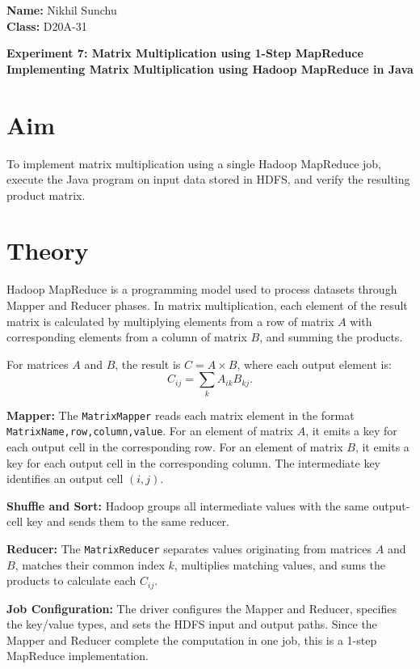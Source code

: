 \documentclass[11pt,a4paper]{article}
\begin{document}
\noindent
\textbf{Name:} Nikhil Sunchu\\
\textbf{Class:} D20A-31

\vspace{0.5em}
\begin{center}
{\Large\bfseries Experiment 7: Matrix Multiplication using 1-Step MapReduce}\\
\textbf{Implementing Matrix Multiplication using Hadoop MapReduce in Java}
\end{center}

\section*{Aim}
To implement matrix multiplication using a single Hadoop MapReduce job, execute the Java program on input data stored in HDFS, and verify the resulting product matrix.

\section{Theory}
Hadoop MapReduce is a programming model used to process datasets through Mapper and Reducer phases. In matrix multiplication, each element of the result matrix is calculated by multiplying elements from a row of matrix $A$ with corresponding elements from a column of matrix $B$, and summing the products.

For matrices $A$ and $B$, the result is $C=A\times B$, where each output element is:
\[
C_{ij}=\sum_k A_{ik}B_{kj}.
\]

\textbf{Mapper:} The \texttt{MatrixMapper} reads each matrix element in the format \texttt{MatrixName,row,column,value}. For an element of matrix $A$, it emits a key for each output cell in the corresponding row. For an element of matrix $B$, it emits a key for each output cell in the corresponding column. The intermediate key identifies an output cell $(i,j)$.

\textbf{Shuffle and Sort:} Hadoop groups all intermediate values with the same output-cell key and sends them to the same reducer.

\textbf{Reducer:} The \texttt{MatrixReducer} separates values originating from matrices $A$ and $B$, matches their common index $k$, multiplies matching values, and sums the products to calculate each $C_{ij}$.

\textbf{Job Configuration:} The driver configures the Mapper and Reducer, specifies the key/value types, and sets the HDFS input and output paths. Since the Mapper and Reducer complete the computation in one job, this is a 1-step MapReduce implementation.
\end{document}
